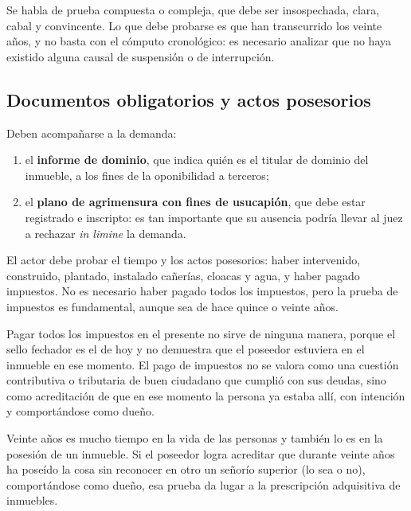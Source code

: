 \documentclass[12pt,oneside]{book}
\begin{document}
Se habla de prueba compuesta o compleja, que debe ser insospechada, clara, cabal y convincente. Lo que debe probarse es que han transcurrido los veinte años, y no basta con el cómputo cronológico: es necesario analizar que no haya existido alguna causal de suspensión o de interrupción.

\subsection{Documentos obligatorios y actos posesorios}

Deben acompañarse a la demanda:
\begin{enumerate}
    \item el \textbf{informe de dominio}, que indica quién es el titular de dominio del inmueble, a los fines de la oponibilidad a terceros;
    \item el \textbf{plano de agrimensura con fines de usucapión}, que debe estar registrado e inscripto: es tan importante que su ausencia podría llevar al juez a rechazar \textit{in limine} la demanda.
\end{enumerate}

El actor debe probar el tiempo y los actos posesorios: haber intervenido, construido, plantado, instalado cañerías, cloacas y agua, y haber pagado impuestos. No es necesario haber pagado todos los impuestos, pero la prueba de impuestos es fundamental, aunque sea de hace quince o veinte años.

\begin{important}
Pagar todos los impuestos en el presente no sirve de ninguna manera, porque el sello fechador es el de hoy y no demuestra que el poseedor estuviera en el inmueble en ese momento. El pago de impuestos no se valora como una cuestión contributiva o tributaria de buen ciudadano que cumplió con sus deudas, sino como acreditación de que en ese momento la persona ya estaba allí, con intención y comportándose como dueño.
\end{important}

Veinte años es mucho tiempo en la vida de las personas y también lo es en la posesión de un inmueble. Si el poseedor logra acreditar que durante veinte años ha poseído la cosa sin reconocer en otro un señorío superior (lo sea o no), comportándose como dueño, esa prueba da lugar a la prescripción adquisitiva de inmuebles.
\end{document}

